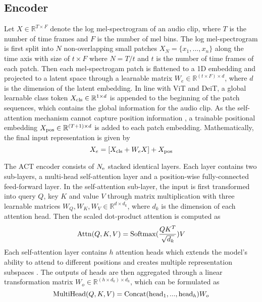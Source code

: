 \documentclass{article}
\begin{document}
\begin{sloppy}
\subsection{Encoder}
\label{ssec:encoder}
Let $X \in \mathbb R^{T\times F}$ denote the log mel-spectrogram of an audio clip, where $T$ is the number of time frames and $F$ is the number of mel bins. The log mel-spectrogram is first split into $N$ non-overlapping small patches $X_N = \{x_1,...,x_n\}$ along the time axis with size of $t \times F$ where $N=T/t$ and $t$ is the number of time frames of each patch. Then each mel-spectrogam patch is flattened to a 1D embedding and projected to a latent space through a learnable matrix $W_e \in \mathbb R^{(t\times F) \times d}$, where $d$ is the dimension of the latent embedding. In line with ViT and DeiT, a global learnable class token $
X_{{\rm cls}}\in \mathbb R^{1 \times d}$ is appended to the beginning of the patch sequences, which contains the global information for the audio clip. As the self-attention mechanism cannot capture position information \cite{vaswani2017attention}, a trainable positional embedding $X_{\rm pos}\in \mathbb R^{(T+1)\times d}$ is added to each patch embedding. Mathematically, the final input representation is given by
\begin{equation}
  \label{eqn:x_input}
  X_e = [X_{\rm cls} + W_eX] + X_{\rm pos}
\end{equation}

The ACT encoder consists of $N_{\rm e}$ stacked identical layers. Each layer contains two sub-layers, a multi-head self-attention layer and a position-wise fully-connected feed-forward layer. In the self-attention sub-layer, the input is first transformed into query $Q$, key $K$ and value $V$ through matrix multiplication with three learnable matrices $W_Q,W_K, W_V \in \mathbb R^{d \times d_k}$, where $d_k$ is the dimension of each attention head. Then the scaled dot-product attention is computed as 
\begin{equation}
  \label{eqn:attention}
  {\rm Attn}(Q,K,V) = {\rm Softmax}(\frac{QK^T} {\sqrt{d_k}})V
\end{equation}
Each self-attention layer contains $h$ attention heads which extends the model's ability to attend to different positions and creates multiple representation subspaces \cite{vaswani2017attention}. The outputs of heads are then aggregated through a linear transformation matrix $W_o \in \mathbb R^{(h\times d_k)\times d_k}$, which can be formulated as
\begin{equation}
  \label{eqn:multi_head}
  {\rm MultiHead}(Q,K,V) = {\rm Concat}({\rm head}_1, ..., {\rm head}_h)W_o
\end{equation}


\end{sloppy}
\end{document}
